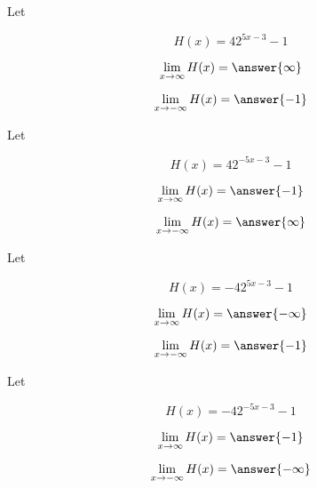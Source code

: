 \documentclass{ximera}
\author{Lee Wayand}
\begin{document}
\begin{exercise}


\begin{question}



Let 

\[
H(x) = 4 2^{5x - 3} - 1
\]



\[
\lim\limits_{x \to \infty} H(x) = \answer{\infty}
\]



\[
\lim\limits_{x \to -\infty} H(x) = \answer{-1}
\]

\end{question}







\begin{question}



Let 

\[
H(x) = 4 2^{-5x - 3} - 1
\]


\[
\lim\limits_{x \to \infty} H(x) = \answer{-1}
\]



\[
\lim\limits_{x \to -\infty} H(x) = \answer{\infty}
\]

\end{question}





\begin{question}



Let 

\[
H(x) = -4 2^{5x - 3} - 1
\]


\[
\lim\limits_{x \to \infty} H(x) = \answer{-\infty}
\]



\[
\lim\limits_{x \to -\infty} H(x) = \answer{-1}
\]


\end{question}





\begin{question}



Let 

\[
H(x) = -4 2^{-5x - 3} - 1
\]


\[
\lim\limits_{x \to \infty} H(x) = \answer{-1}
\]



\[
\lim\limits_{x \to -\infty} H(x) = \answer{-\infty}
\]

\end{question}








\end{exercise}
\end{document}
